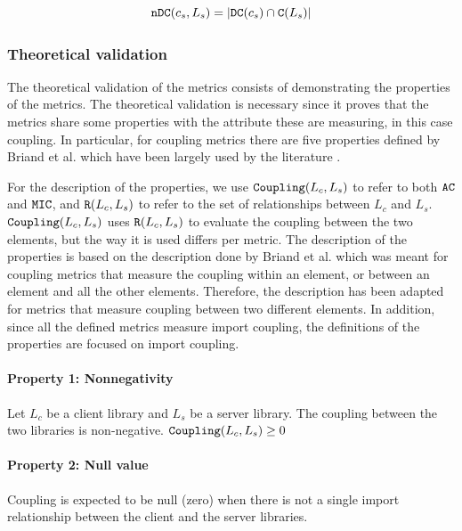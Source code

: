\begin{equation}
\label{eqn:ac-ndc}
    \verb|nDC|(c_s, L_s) = |\verb|DC|(c_s) \cap \verb|C|(L_s)|
\end{equation}

\subsubsection{Theoretical validation}
The theoretical validation of the metrics consists of demonstrating the properties of the metrics. The theoretical validation is necessary since it proves that the metrics share some properties with the attribute these are measuring, in this case coupling. In particular, for coupling metrics there are five properties defined by Briand et al. \cite{briand1996property} which have been largely used by the literature \cite{poshyvanyk2006conceptual, allen1999measuring, zhao2004measuring}.

For the description of the properties, we use $\verb|Coupling|(L_c, L_s)$ to refer to both $\verb|AC|$ and $\verb|MIC|$, and $\verb|R|(L_c, L_s)$ to refer to the set of relationships between $L_c$ and $L_s$. $\verb|Coupling|(L_c, L_s)$ uses $\verb|R|(L_c, L_s)$ to evaluate the coupling between the two elements, but the way it is used differs per metric. The description of the properties is based on the description done by Briand et al. \cite{briand1996property} which was meant for coupling metrics that measure the coupling within an element, or between an element and all the other elements. Therefore, the description has been adapted for metrics that measure coupling between two different elements. In addition, since all the defined metrics measure import coupling, the definitions of the properties are focused on import coupling.

\paragraph{Property 1: Nonnegativity}

Let $L_c$ be a client library and $L_s$ be a server library. The coupling between the two libraries is non-negative. $\verb|Coupling|(L_c, L_s) \ge 0$

\paragraph{Property 2: Null value}
Coupling is expected to be null (zero) when there is not a single import relationship between the client and the server libraries.

